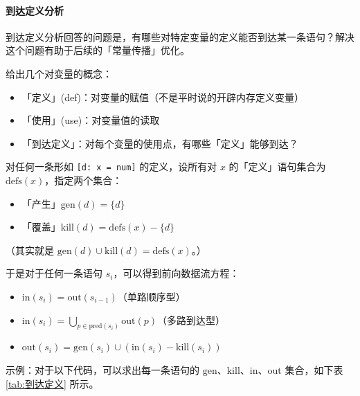 \documentclass[UTF8]{ctexart}
\newcommand\GEN{\mathrm{gen}}
\newcommand\KILL{\mathrm{kill}}
\newcommand\IN{\mathrm{in}}
\newcommand\OUT{\mathrm{out}}
\newcommand\Emph[1]{\textcolor{cyan!80!black}{#1}}
\newcommand\Notes[1]{\textcolor{yellow!50!black}{\small #1}}
\begin{document}
\paragraph{到达定义分析}
\Emph{到达定义分析}回答的问题是，有哪些对特定变量的定义能否到达某一条语句？解决这个问题有助于后续的「常量传播」优化。

给出几个对变量的概念：
\begin{itemize}[itemsep=0pt,parsep=0pt,leftmargin=1.5cm]
  \item 「定义」(def)：对变量的赋值\Notes{（不是平时说的开辟内存定义变量）}
  \item 「使用」(use)：对变量值的读取
  \item 「到达定义」：对每个变量的使用点，有哪些「定义」能够到达？
\end{itemize}

对任何一条形如 \verb![d: x = num]! 的定义，设所有对 $x$ 的「定义」语句集合为 $\mathrm{defs}(x)$，指定两个集合：
\begin{itemize}[itemsep=0pt,parsep=0pt,leftmargin=1.5cm]
  \item 「产生」$\GEN(d) = \{d\}$
  \item 「覆盖」$\KILL(d) = \mathrm{defs}(x) - \{d\}$
\end{itemize}
\Notes{（其实就是 $\GEN(d)\cup \KILL(d) = \mathrm{defs}(x)$。）}

于是对于任何一条语句 $s_i$，可以得到\Emph{前向}数据流方程：
\begin{itemize}[leftmargin=1.5cm]
  \item $\IN(s_i) = \OUT(s_{i-1})$（单路顺序型）
  \item $\IN(s_i) = \bigcup\limits_{p\in\mathrm{pred}(s_i)} \OUT(p)$（多路到达型）
  \item $\OUT(s_i) = \GEN(s_i) \cup (\IN(s_i) - \KILL(s_i))$
\end{itemize}

示例：对于以下代码，可以求出每一条语句的 $\GEN$、$\KILL$、$\IN$、$\OUT$ 集合，如下表 \ref{tab:到达定义} 所示。
\end{document}
